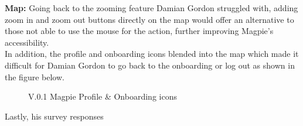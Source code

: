\newpage
\noindent\textbf{Map: }
Going back to the zooming feature Damian Gordon struggled with, adding zoom in and zoom out buttons directly on the map would offer an alternative to those not able to use the mouse for the action, further improving Magpie's accessibility.\\In addition, the profile and onboarding icons blended into the map which made it difficult for Damian Gordon to go back to the onboarding or log out as shown in the figure below.
\begin{figure}
    \centering
    \caption{V.0.1 Magpie Profile \& Onboarding icons}
\end{figure}

\newpage
Lastly, his survey responses 
